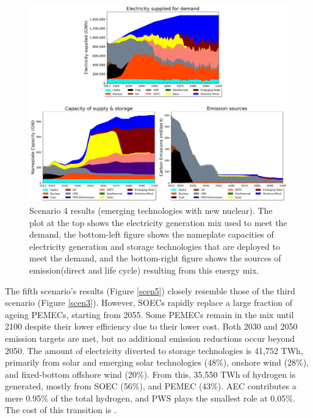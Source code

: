 \begin{figure}[H] 
\centering
\includegraphics[scale=0.5]{figures/newtechs_nuc}
\caption{Scenario 4 results (emerging technologies with new nuclear). The plot at the top shows the electricity generation mix used to meet the demand, the bottom-left figure shows the nameplate capacities of electricity generation and storage technologies that are deployed to meet the demand, and the bottom-right figure shows the sources of emission(direct and life cycle) resulting from this energy mix.}
\label{scen4}
\end{figure}

The fifth scenario's results (Figure \ref{scen5}) closely resemble those of the third scenario (Figure \ref{scen3}). However, \gls{SOEC}s rapidly replace a large fraction of ageing \gls{PEMEC}s, starting from 2055. Some \gls{PEMEC}s remain in the mix until 2100 despite their lower efficiency due to their lower cost. Both 2030 and 2050 emission targets are met, but no additional emission reductions occur beyond 2050. The amount of electricity diverted to storage technologies is 41,752 TWh, primarily from solar and emerging solar technologies (48\%), onshore wind (28\%), and fixed-bottom offshore wind (20\%). From this, 35,550 TWh of hydrogen is generated, mostly from \gls{SOEC} (56\%), and \gls{PEMEC} (43\%). \gls{AEC} contributes a mere 0.95\% of the total hydrogen, and \gls{PWS} plays the smallest role at 0.05\%. The cost of this transition is  .

